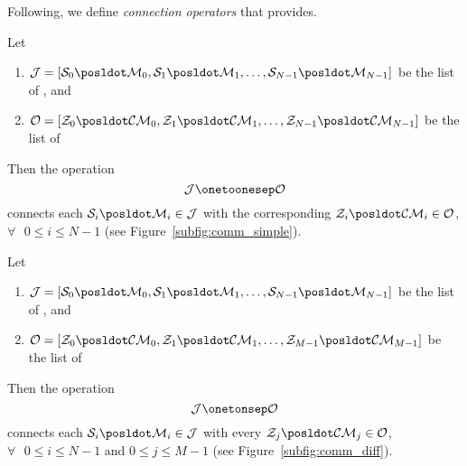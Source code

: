 
Following, we define \textit{connection operators} that \posl{} provides.

\begin{definition}\label{op_conn:1to1}
 Let 
\begin{enumerate}
\item $\mathcal{J} = \left[\mathcal{S}_0\posldot \mathcal{M}_0, \mathcal{S}_1\posldot \mathcal{M}_1,\dots, \mathcal{S}_{N-1}\posldot \mathcal{M}_{N-1}\right]$ be the list of \jacks, and
\item $\mathcal{O} = \left[\mathcal{Z}_0\posldot \mathcal{CM}_0, \mathcal{Z}_1\posldot \mathcal{CM}_1,\dots, \mathcal{Z}_{N-1}\posldot \mathcal{CM}_{N-1}\right]$ be the list of \outlets{}
\end{enumerate} Then the operation 
\[
\mathcal{J} \onetoonesep \mathcal{O}
\]
connects each \jack{} $\mathcal{S}_i\posldot \mathcal{M}_i \in \mathcal{J}$ with the corresponding \outlet{} $\mathcal{Z}_i\posldot \mathcal{CM}_i \in \mathcal{O}$, $\forall\textbf{ }0 \leq i \leq N-1$ (see Figure~\ref{subfig:comm_simple}).
\end{definition}

\separation

\begin{definition}\label{op_conn:1ton}
 Let 
\begin{enumerate} 
\item $\mathcal{J} = \left[\mathcal{S}_0\posldot \mathcal{M}_0, \mathcal{S}_1\posldot \mathcal{M}_1,\dots, \mathcal{S}_{N-1}\posldot \mathcal{M}_{N-1}\right]$ be the list of \jacks, and 
\item $\mathcal{O} = \left[\mathcal{Z}_0\posldot \mathcal{CM}_0, \mathcal{Z}_1\posldot \mathcal{CM}_1,\dots, \mathcal{Z}_{M-1}\posldot \mathcal{CM}_{M-1}\right]$ be the list of \outlets{} 
\end{enumerate} Then the operation 
\[
\mathcal{J} \onetonsep \mathcal{O}
\]
connects each \jack{} $\mathcal{S}_i\posldot \mathcal{M}_i \in \mathcal{J}$ with every \outlet{} $\mathcal{Z}_j\posldot \mathcal{CM}_j \in \mathcal{O}$, $\forall\textbf{ }0 \leq i \leq N-1$ and $0 \leq j \leq M-1$ (see Figure~\ref{subfig:comm_diff}).
\end{definition}

